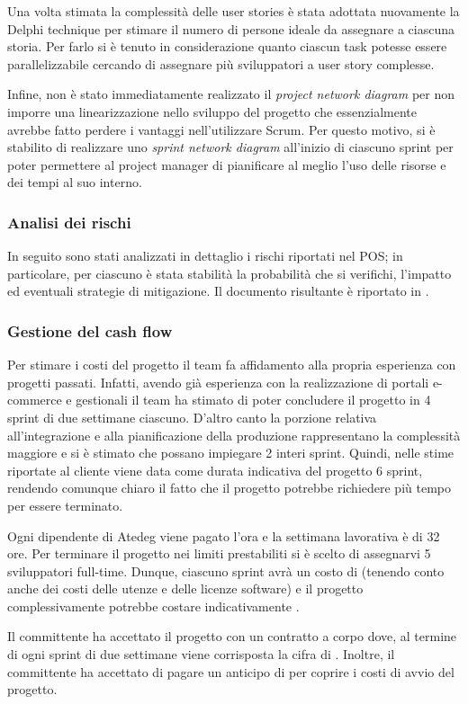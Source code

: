 Una volta stimata la complessità delle user stories è stata adottata nuovamente la Delphi technique per stimare il numero di persone ideale da assegnare a ciascuna storia. Per farlo si è tenuto in considerazione quanto ciascun task potesse essere parallelizzabile cercando di assegnare più sviluppatori a user story complesse.

Infine, non è stato immediatamente realizzato il \emph{project network diagram} per non imporre una linearizzazione nello sviluppo del progetto che essenzialmente avrebbe fatto perdere i vantaggi nell'utilizzare Scrum. Per questo motivo, si è stabilito di realizzare uno \emph{sprint network diagram} all'inizio di ciascuno sprint per poter permettere al project manager di pianificare al meglio l'uso delle risorse e dei tempi al suo interno.

\subsubsection{Analisi dei rischi}
In seguito sono stati analizzati in dettaglio i rischi riportati nel POS; in particolare, per ciascuno è stata stabilità la probabilità che si verifichi, l'impatto ed eventuali strategie di mitigazione. Il documento risultante è riportato in .

\subsubsection{Gestione del cash flow}
Per stimare i costi del progetto il team fa affidamento alla propria esperienza con progetti passati. Infatti, avendo già esperienza con la realizzazione di portali e-commerce e gestionali il team ha stimato di poter concludere il progetto in 4 sprint di due settimane ciascuno. D'altro canto la porzione relativa all'integrazione e alla pianificazione della produzione rappresentano la complessità maggiore e si è stimato che possano impiegare 2 interi sprint. 
Quindi, nelle stime riportate al cliente viene data come durata indicativa del progetto 6 sprint, rendendo comunque chiaro il fatto che il progetto potrebbe richiedere più tempo per essere terminato.

Ogni dipendente di Atedeg viene pagato  l'ora e la settimana lavorativa è di 32 ore. Per terminare il progetto nei limiti prestabiliti si è scelto di assegnarvi 5 sviluppatori full-time. Dunque, ciascuno sprint avrà un costo di  (tenendo conto anche dei costi delle utenze e delle licenze software) e il progetto complessivamente potrebbe costare indicativamente .

Il committente ha accettato il progetto con un contratto a corpo dove, al termine di ogni sprint di due settimane viene corrisposta la cifra di .
Inoltre, il committente ha accettato di pagare un anticipo di  per coprire i costi di avvio del progetto.
